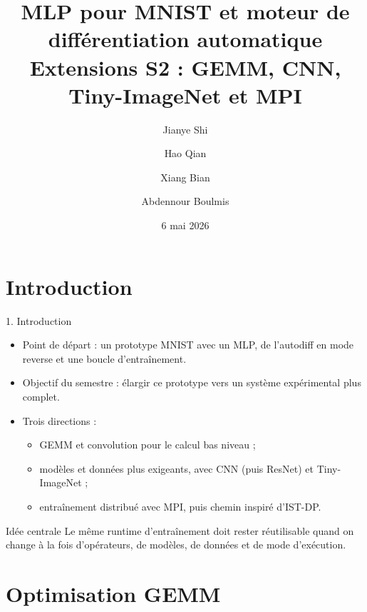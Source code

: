 \documentclass[aspectratio=169]{beamer}
\title[Rapport S2]{MLP pour MNIST et moteur de différentiation automatique\\Extensions S2 : GEMM, CNN, Tiny-ImageNet et MPI}
\author[Jianye Shi et al.]{Jianye Shi \and Hao Qian \and Xiang Bian \and Abdennour Boulmis}
\institute[UVSQ]{Master CHPS -- UVSQ\\Encadrement : Aurélien Delval}
\date{6 mai 2026}
\begin{document}
\begin{frame}
  \titlepage
\end{frame}

\section{Introduction}

\begin{frame}{1. Introduction}
\small
\begin{itemize}
  \item Point de départ : un prototype MNIST avec un MLP, de l'autodiff en mode reverse et une boucle d'entraînement.
  \item Objectif du semestre : élargir ce prototype vers un système expérimental plus complet.
  \item Trois directions :
  \begin{itemize}
    \item GEMM et convolution pour le calcul bas niveau ;
    \item modèles et données plus exigeants, avec CNN (puis ResNet) et Tiny-ImageNet ;
    \item entraînement distribué avec MPI, puis chemin inspiré d'IST-DP.
  \end{itemize}
\end{itemize}

\begin{alertblock}{Idée centrale}
Le même runtime d'entraînement doit rester réutilisable quand on change à la fois d'opérateurs, de modèles, de données et de mode d'exécution.
\end{alertblock}

\end{frame}
\section{Optimisation GEMM}
\end{document}
